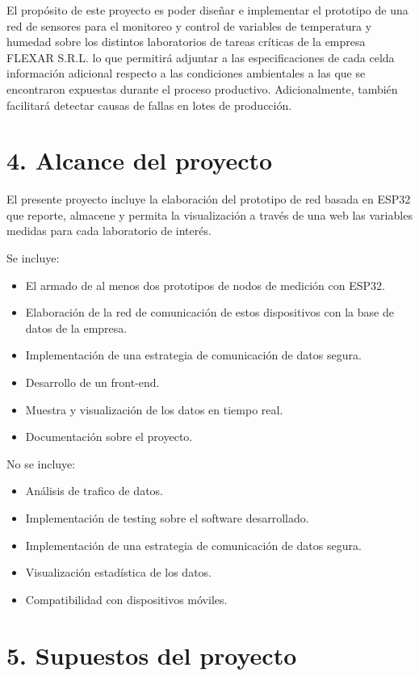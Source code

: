 \documentclass[
11pt, %
codirector, %
]{charter}
\begin{document}
El propósito de este proyecto es poder diseñar e implementar el prototipo de una red de sensores para el monitoreo y control de variables de temperatura y humedad sobre los distintos laboratorios de tareas críticas de la empresa FLEXAR S.R.L. lo que permitirá adjuntar a las especificaciones de cada celda información adicional respecto a las condiciones ambientales a las que se encontraron expuestas durante el proceso productivo. Adicionalmente, también facilitará detectar causas de fallas en lotes de producción.

\section{4. Alcance del proyecto}
\label{sec:alcance}

El presente proyecto incluye la elaboración del prototipo de red basada en ESP32 que reporte, almacene y permita la visualización a través de una web las variables medidas para cada laboratorio de interés.

Se incluye:
\begin{itemize}
\item El armado de al menos dos prototipos de nodos de medición con ESP32.
\item Elaboración de la red de comunicación de estos dispositivos con la base de datos de la empresa.
\item Implementación de una estrategia de comunicación de datos segura.
\item Desarrollo de un front-end.
\item Muestra y visualización de los datos en tiempo real.
\item Documentación sobre el proyecto.
\end{itemize}

No se incluye:
\begin{itemize}
\item Análisis de trafico de datos.
\item Implementación de testing sobre el software desarrollado.
\item Implementación de una estrategia de comunicación de datos segura.
\item Visualización estadística de los datos.
\item Compatibilidad con dispositivos móviles.
\end{itemize}


\section{5. Supuestos del proyecto}
\label{sec:supuestos}
\end{document}
